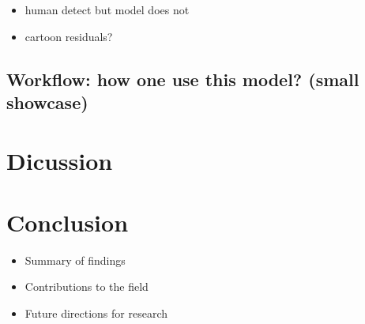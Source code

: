 \documentclass[]{interact}
\theoremstyle{plain}%
\theoremstyle{definition}
\theoremstyle{remark}
\providecommand{\tightlist}{%
  \setlength{\itemsep}{0pt}\setlength{\parskip}{0pt}}
\def\tightlist{}
\begin{document}
\begin{itemize}
\tightlist
\item
  human detect but model does not
\item
  cartoon residuals?
\end{itemize}

\hypertarget{workflow-how-one-use-this-model-small-showcase}{%
\subsection{Workflow: how one use this model? (small
showcase)}\label{workflow-how-one-use-this-model-small-showcase}}

\hypertarget{dicussion}{%
\section{Dicussion}\label{dicussion}}

\hypertarget{conclusion}{%
\section{Conclusion}\label{conclusion}}

\begin{itemize}
\tightlist
\item
  Summary of findings
\item
  Contributions to the field
\item
  Future directions for research
\end{itemize}



\end{document}
